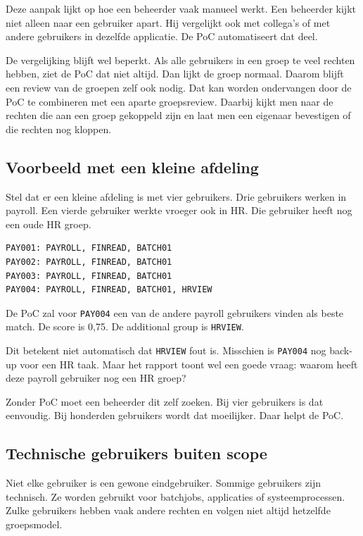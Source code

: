 Deze aanpak lijkt op hoe een beheerder vaak manueel werkt. Een beheerder kijkt niet alleen naar een gebruiker apart. Hij vergelijkt ook met collega's of met andere gebruikers in dezelfde applicatie. De PoC automatiseert dat deel.

De vergelijking blijft wel beperkt. Als alle gebruikers in een groep te veel rechten hebben, ziet de PoC dat niet altijd. Dan lijkt de groep normaal. Daarom blijft een review van de groepen zelf ook nodig. Dat kan worden ondervangen door de PoC te combineren met een aparte groepsreview. Daarbij kijkt men naar de rechten die aan een groep gekoppeld zijn en laat men een eigenaar bevestigen of die rechten nog kloppen.

\subsection*{Voorbeeld met een kleine afdeling}

Stel dat er een kleine afdeling is met vier gebruikers. Drie gebruikers werken in payroll. Een vierde gebruiker werkte vroeger ook in HR. Die gebruiker heeft nog een oude HR groep.

\begin{verbatim}
PAY001: PAYROLL, FINREAD, BATCH01
PAY002: PAYROLL, FINREAD, BATCH01
PAY003: PAYROLL, FINREAD, BATCH01
PAY004: PAYROLL, FINREAD, BATCH01, HRVIEW
\end{verbatim}

De PoC zal voor \texttt{PAY004} een van de andere payroll gebruikers vinden als beste match. De score is 0,75. De additional group is \texttt{HRVIEW}.

Dit betekent niet automatisch dat \texttt{HRVIEW} fout is. Misschien is \texttt{PAY004} nog back-up voor een HR taak. Maar het rapport toont wel een goede vraag: waarom heeft deze payroll gebruiker nog een HR groep?

Zonder PoC moet een beheerder dit zelf zoeken. Bij vier gebruikers is dat eenvoudig. Bij honderden gebruikers wordt dat moeilijker. Daar helpt de PoC.

\subsection*{Technische gebruikers buiten scope}

Niet elke gebruiker is een gewone eindgebruiker. Sommige gebruikers zijn technisch. Ze worden gebruikt voor batchjobs, applicaties of systeemprocessen. Zulke gebruikers hebben vaak andere rechten en volgen niet altijd hetzelfde groepsmodel.

